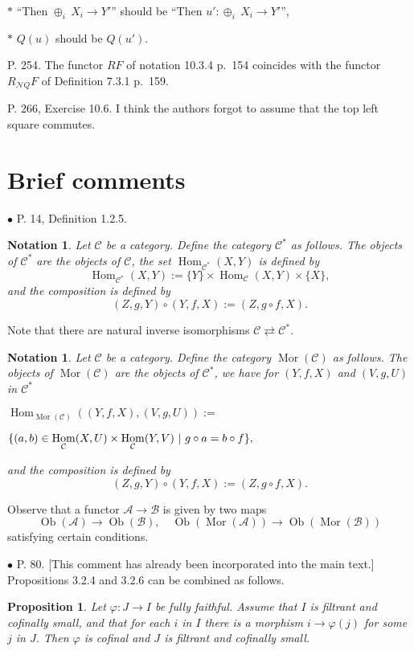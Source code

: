 \documentclass[12pt]{article}
\newtheorem{prop}[thm]{Proposition}
\newtheorem{nota}[thm]{Notation}
\theoremstyle{remark}
\newcommand{\bu}{\bullet}
\newcommand{\n}{\noindent}
\newcommand{\cc}{\mathcal}
\newcommand{\A}{\mathcal A}
\newcommand{\B}{\mathcal B}
\newcommand{\C}{\mathcal C}
\newcommand{\p}{\varphi}
\newcommand{\pr}{Proposition}
\DeclareMathOperator{\h}{Hom}
\DeclareMathOperator{\Mor}{Mor}
\DeclareMathOperator{\Ob}{Ob}
\begin{document}
$*$ ``Then $\oplus_i\ X_i\to Y'$'' should be ``Then $u':\oplus_i\ X_i\to Y'$'', 

$*$ $Q(u)$ should be $Q(u')$. 

\n P. 254. The functor $RF$ of notation 10.3.4 p.~154 coincides with the functor $R_{\cc NQ}F$ of Definition 7.3.1 p.~159.

\n P. 266, Exercise 10.6. I think the authors forgot to assume that the top left square commutes. 
% 
\section{Brief comments} %
%
\n$\bu$ P. 14, Definition 1.2.5.
%
\begin{nota}\label{c*}%
%
Let $\C$ be a category. Define the category $\C^*$ as follows. The objects of $\C^*$ are the objects of $\C$, the set $\h_{\C^*}(X,Y)$ is defined by  
$$
\h_{\C^*}(X,Y):=\{Y\}\times\h_{\C}(X,Y)\times\{X\},
$$
and the composition is defined by 
$$
(Z,g,Y)\circ(Y,f,X):=(Z,g\circ f,X).
$$ 
%
\end{nota}
%
Note that there are natural inverse isomorphisms $\C\rightleftarrows\C^*$. 
%
\begin{nota}\label{mor}
%
Let $\C$ be a category. Define the category $\Mor(\C)$ as follows. The objects of $\Mor(\C)$ are the objects of $\C^*$, we have for $(Y,f,X)$ and $(V,g,U)$ in $\C^*$\bigskip 

\n$\displaystyle \h_{\Mor(\C)}((Y,f,X),(V,g,U)):=$\bigskip 

$\hfill\displaystyle\{(a,b)\in\h_\C(X,U)\times\h_\C(Y,V)\ | \ g\circ a=b\circ f\},$\bigskip 

\n and the composition is defined by 
$$
(Z,g,Y)\circ(Y,f,X):=(Z,g\circ f,X).
$$
%
\end{nota}
%
Observe that a functor $\A\to\B$ is given by two maps 
$$
\Ob(\A)\to\Ob(\B),\quad\Ob(\Mor(\A))\to\Ob(\Mor(\B))
$$ 
satisfying certain conditions. 


\n$\bu$ P. 80. [This comment has already been incorporated into the main text.] \pr s 3.2.4 and 3.2.6 can be combined as follows. 

\begin{prop}\label{comb} 
Let $\p:J\to I$ be fully faithful. Assume that $I$ is filtrant and cofinally small, and that for each $i$ in $I$ there is a morphism $i\to\p(j)$ for some $j$ in $J$. Then $\p$ is cofinal and $J$ is filtrant and cofinally small. 
\end{prop} 
\end{document}

